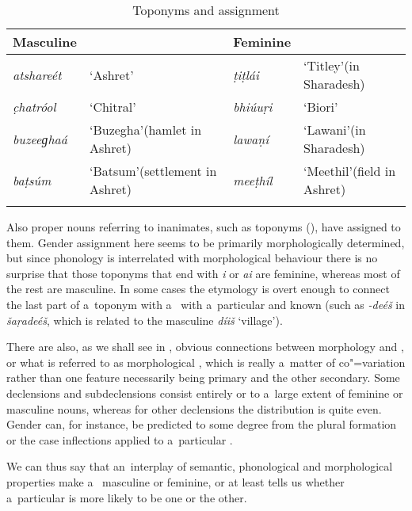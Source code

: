 \begin{table}[b]
\caption{Toponyms and  assignment}
\begin{tabularx}{\textwidth}{ l Q l Q }
\lsptoprule
Masculine &
&
Feminine &
\\\midrule
\textit{atshareét} &
`Ashret' &
\textit{ṭiṭlái} &
`Titley'\newline (in Sharadesh)\\
\textit{c̣hatróol} &
`Chitral' &
\textit{bhiúuṛi} &
`Biori'\\
\textit{buzeeɡhaá} &
`Buzegha'\newline (hamlet in Ashret) &
\textit{lawaṇí} &
`Lawani'\newline (in Sharadesh)\\
\textit{baṭsúm} &
`Batsum'\newline (settlement in Ashret) &
\textit{meeṭhíl} &
`Meethil'\newline (field in Ashret)\\\lspbottomrule
\end{tabularx}
\label{tab:4-3}
\end{table}


Also proper nouns referring to inanimates, such as toponyms (), have  assigned to them. Gender assignment here seems to be primarily morphologically determined, but since phonology is interrelated with morphological behaviour there is no surprise that those toponyms that end with \textit{i} or \textit{ai} are feminine, whereas most of the rest are masculine. In some cases the etymology is overt enough to connect the last part of a~toponym with a~ with a~particular and known  (such as \textit{-deéš} in \textit{šaṛadeéš}, which is related to the masculine  \textit{díiš} `village').


There are also, as we shall see in , obvious connections between  morphology and , or what is referred to as morphological  \citep[34--50]{corbett1991}, which is really a~matter of co"=variation rather than one feature necessarily being primary and the other secondary. Some declensions and subdeclensions consist entirely or to a~large extent of feminine or masculine nouns, whereas for other declensions the  distribution is quite even. Gender can, for instance, be predicted to some degree from the plural formation or the case inflections applied to a~particular .


We can thus say that an~interplay of semantic, phonological and morphological properties make a~ masculine or feminine, or at least tells us whether a~particular  is more likely to be one or the other. 


